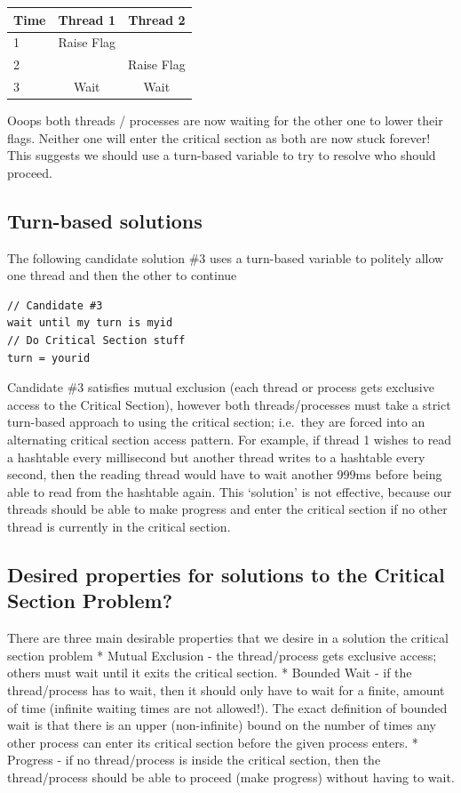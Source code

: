 \begin{tabular}{|l|c|c|}
Time & Thread 1 & Thread 2 \\ \hline
1 & Raise Flag & \\
2 & & Raise Flag \\
3 & Wait & Wait \\
\end{tabular}

Ooops both threads / processes are now waiting for the other one to lower their flags. Neither one will enter the critical section as both are now stuck forever! This suggests we should use a turn-based variable to try to resolve who should proceed.

\subsection{Turn-based solutions}\label{turn-based-solutions}

The following candidate solution \#3 uses a turn-based variable to politely allow one thread and then the other to continue

\begin{lstlisting}
// Candidate #3
wait until my turn is myid
// Do Critical Section stuff
turn = yourid
\end{lstlisting}

Candidate \#3 satisfies mutual exclusion (each thread or process gets exclusive access to the Critical Section), however both threads/processes must take a strict turn-based approach to using the critical section; i.e.~they are forced into an alternating critical section access pattern. For example, if thread 1 wishes to read a hashtable every millisecond but another thread writes to a hashtable every second, then the reading thread would have to wait another 999ms before being able to read from the hashtable again. This `solution' is not effective, because our threads should be able to make progress and enter the critical section if no other thread is currently in the critical section.

\subsection{Desired properties for solutions to the Critical Section Problem?}\label{desired-properties-for-solutions-to-the-critical-section-problem}

There are three main desirable properties that we desire in a solution the critical section problem * Mutual Exclusion - the thread/process gets exclusive access; others must wait until it exits the critical section. * Bounded Wait - if the thread/process has to wait, then it should only have to wait for a finite, amount of time (infinite waiting times are not allowed!). The exact definition of bounded wait is that there is an upper (non-infinite) bound on the number of times any other process can enter its critical section before the given process enters. * Progress - if no thread/process is inside the critical section, then the thread/process should be able to proceed (make progress) without having to wait.

